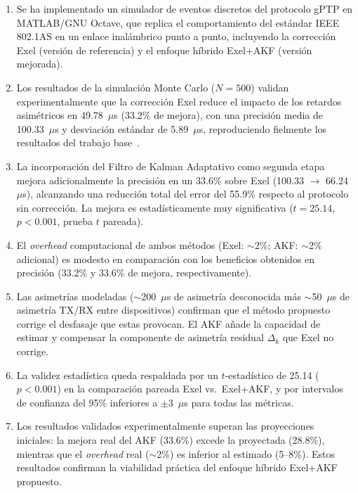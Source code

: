 \begin{enumerate}
\item Se ha implementado un simulador de eventos discretos del protocolo gPTP en MATLAB/GNU Octave, que replica el comportamiento del estándar IEEE 802.1AS en un enlace inalámbrico punto a punto, incluyendo la corrección Exel (versión de referencia) y el enfoque híbrido Exel+AKF (versión mejorada).

\item Los resultados de la simulación Monte Carlo ($N = 500$) validan experimentalmente que la corrección Exel reduce el impacto de los retardos asimétricos en 49.78~$\mu$s (33.2\% de mejora), con una precisión media de 100.33~$\mu$s y desviación estándar de 5.89~$\mu$s, reproduciendo fielmente los resultados del trabajo base~\cite{eupierre2024}.

\item La incorporación del Filtro de Kalman Adaptativo como segunda etapa mejora adicionalmente la precisión en un 33.6\% sobre Exel (100.33 $\rightarrow$ 66.24~$\mu$s), alcanzando una reducción total del error del 55.9\% respecto al protocolo sin corrección. La mejora es estadísticamente muy significativa ($t = 25.14$, $p < 0.001$, prueba $t$ pareada).

\item El \textit{overhead} computacional de ambos métodos (Exel: $\sim$2\%; AKF: $\sim$2\% adicional) es modesto en comparación con los beneficios obtenidos en precisión (33.2\% y 33.6\% de mejora, respectivamente).

\item Las asimetrías modeladas ($\sim$200~$\mu$s de asimetría desconocida más $\sim$50~$\mu$s de asimetría TX/RX entre dispositivos) confirman que el método propuesto corrige el desfasaje que estas provocan. El AKF añade la capacidad de estimar y compensar la componente de asimetría residual $\Delta_k$ que Exel no corrige.

\item La validez estadística queda respaldada por un $t$-estadístico de 25.14 ($p < 0.001$) en la comparación pareada Exel vs.~Exel+AKF, y por intervalos de confianza del 95\% inferiores a $\pm 3$~$\mu$s para todas las métricas.

\item Los resultados validados experimentalmente superan las proyecciones iniciales: la mejora real del AKF (33.6\%) excede la proyectada (28.8\%), mientras que el \textit{overhead} real ($\sim$2\%) es inferior al estimado (5--8\%). Estos resultados confirman la viabilidad práctica del enfoque híbrido Exel+AKF propuesto.
\end{enumerate}

